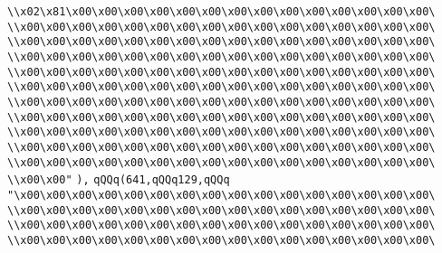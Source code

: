 \verb|\\x02\x81\x00\x00\x00\x00\x00\x00\x00\x00\x00\x00\x00\x00\x00\x00\|\newline
\verb|\\x00\x00\x00\x00\x00\x00\x00\x00\x00\x00\x00\x00\x00\x00\x00\x00\|\newline
\verb|\\x00\x00\x00\x00\x00\x00\x00\x00\x00\x00\x00\x00\x00\x00\x00\x00\|\newline
\verb|\\x00\x00\x00\x00\x00\x00\x00\x00\x00\x00\x00\x00\x00\x00\x00\x00\|\newline
\verb|\\x00\x00\x00\x00\x00\x00\x00\x00\x00\x00\x00\x00\x00\x00\x00\x00\|\newline
\verb|\\x00\x00\x00\x00\x00\x00\x00\x00\x00\x00\x00\x00\x00\x00\x00\x00\|\newline
\verb|\\x00\x00\x00\x00\x00\x00\x00\x00\x00\x00\x00\x00\x00\x00\x00\x00\|\newline
\verb|\\x00\x00\x00\x00\x00\x00\x00\x00\x00\x00\x00\x00\x00\x00\x00\x00\|\newline
\verb|\\x00\x00\x00\x00\x00\x00\x00\x00\x00\x00\x00\x00\x00\x00\x00\x00\|\newline
\verb|\\x00\x00\x00\x00\x00\x00\x00\x00\x00\x00\x00\x00\x00\x00\x00\x00\|\newline
\verb|\\x00\x00\x00\x00\x00\x00\x00\x00\x00\x00\x00\x00\x00\x00\x00\x00\|\newline
\verb|\\x00\x00"|\newline
\verb|),|\newline
\verb|qQQq(641,qQQq129,qQQq|\newline
\verb|"\x00\x00\x00\x00\x00\x00\x00\x00\x00\x00\x00\x00\x00\x00\x00\x00\|\newline
\verb|\\x00\x00\x00\x00\x00\x00\x00\x00\x00\x00\x00\x00\x00\x00\x00\x00\|\newline
\verb|\\x00\x00\x00\x00\x00\x00\x00\x00\x00\x00\x00\x00\x00\x00\x00\x00\|\newline
\verb|\\x00\x00\x00\x00\x00\x00\x00\x00\x00\x00\x00\x00\x00\x00\x00\x00\|\newline
